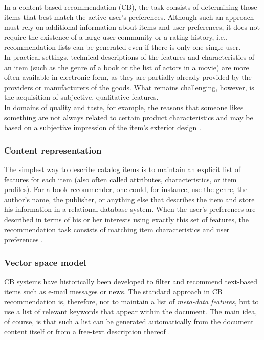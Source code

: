 In a content-based recommendation (CB), the task consists of determining
those items that best match the active user’s preferences. Although such an
approach must rely on additional information about items and user
preferences, it does not require the existence of a large user
community or a rating history, i.e., recommendation lists can be
generated even if there is only one single user. \\In practical
settings, technical descriptions of the features and characteristics
of an item (such as the genre of a book or the list of actors in a
movie) are more often available in electronic form, as they are
partially already provided by the providers or manufacturers of the
goods. What remains challenging, however, is the acquisition of
subjective, qualitative features. \\In domains of quality and taste, for
example, the reasons that someone likes something are not always
related to certain product characteristics and may be based on a
subjective impression of the item’s exterior design 
\cite{jannach2010recommender}.    

\subsubsection{Content representation} 

The simplest way to describe catalog
items is to maintain an explicit list of features for each item (also
often called attributes, characteristics, or item profiles). For a
book recommender, one could, for instance, use the genre, the author’s
name, the publisher, or anything else that describes the item and
store his information in a relational database system. When the user’s
preferences are described in terms of his or her interests using
exactly this set of features, the recommendation task consists of
matching item characteristics and user preferences 
\cite{jannach2010recommender}.  

\subsubsection{Vector space model}  

CB systems have historically
been developed to filter and recommend text-based items such as e-mail
messages or news. The standard approach in CB recommendation is,
therefore, not to maintain a list of \textit{meta-data
features}, but to use a list of relevant keywords that appear within
the document. The main idea, of course, is that such a list can be
generated automatically from the document content itself or from a
free-text description thereof \cite{jannach2010recommender}.

